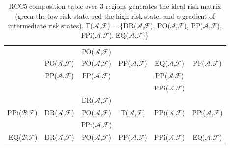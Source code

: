\documentclass[runningheads]{llncs}
\newcommand{\assertionRegion}{\mathcal{A}}
\newcommand{\beliefRegion}{\mathcal{B}}
\newcommand{\factRegion}{\mathcal{F}}
\newcommand{\eq}[2]{EQ(#1,#2)}
\newcommand{\pp}[2]{PP(#1,#2)}
\newcommand{\po}[2]{PO(#1,#2)}
\newcommand{\ppi}[2]{PPi(#1,#2)}
\newcommand{\dr}[2]{DR(#1,#2)}
\newcommand{\all}[2]{T(#1,#2)}
\begin{document}
\begin{table}[t]
\begin{adjustbox}{width=.6\columnwidth}
\begin{tabular}{r||c|c|c|c|c}
	\cellcolor{abf-rg-3}&
	\cellcolor{abf-rg-4} & %
	\cellcolor{abf-rg-5}\po{$\assertionRegion$}{$\factRegion$} & %
	\cellcolor{abf-rg-6}\\ %
 & \cellcolor{abf-rg-2}\po{$\assertionRegion$}{$\factRegion$} & 
	\cellcolor{abf-rg-3}\po{$\assertionRegion$}{$\factRegion$} & 
	\cellcolor{abf-rg-4}\pp{$\assertionRegion$}{$\factRegion$} & %
	\cellcolor{abf-rg-5}\eq{$\assertionRegion$}{$\factRegion$} & %
	\cellcolor{abf-rg-6}\pp{$\assertionRegion$}{$\factRegion$} \\ %
 & \cellcolor{abf-rg-2}\pp{$\assertionRegion$}{$\factRegion$} & 
	\cellcolor{abf-rg-3}\pp{$\assertionRegion$}{$\factRegion$} & 
	\cellcolor{abf-rg-4} & %
	\cellcolor{abf-rg-5}\pp{$\assertionRegion$}{$\factRegion$} & %
	\cellcolor{abf-rg-6} \\ %
 & \cellcolor{abf-rg-2}&
 	\cellcolor{abf-rg-3} & 
	\cellcolor{abf-rg-4}& %
	\cellcolor{abf-rg-5}\ppi{$\assertionRegion$}{$\factRegion$} & %
	\cellcolor{abf-rg-6} \\ %
\hline %
 \multirow{3}{*}{\ppi{$\beliefRegion$}{$\factRegion$}} &
 	\cellcolor{abf-rg-3}\multirow{3}{*}{} &
 	\cellcolor{abf-rg-4}\dr{$\assertionRegion$}{$\factRegion$} &
 	\cellcolor{abf-rg-5}& %
 	\cellcolor{abf-rg-6}& %
 	\cellcolor{abf-rg-7} \\ %
& \cellcolor{abf-rg-3}\dr{$\assertionRegion$}{$\factRegion$} &
 	\cellcolor{abf-rg-4}\po{$\assertionRegion$}{$\factRegion$} & 
 	\cellcolor{abf-rg-5}\all{$\assertionRegion$}{$\factRegion$}& %
 	\cellcolor{abf-rg-6}\ppi{$\assertionRegion$}{$\factRegion$}& %
 	\cellcolor{abf-rg-7}\ppi{$\assertionRegion$}{$\factRegion$}\\ %
& \cellcolor{abf-rg-3} & 
	\cellcolor{abf-rg-4}\ppi{$\assertionRegion$}{$\factRegion$} & 
	\cellcolor{abf-rg-5} & %
	\cellcolor{abf-rg-6}& %
	\cellcolor{abf-rg-7}\\ %
\hline %
	\eq{$\beliefRegion$}{$\factRegion$} & 
	\cellcolor{abf-rg-4}\dr{$\assertionRegion$}{$\factRegion$} & 
	\cellcolor{abf-rg-5} \po{$\assertionRegion$}{$\factRegion$} & 
	\cellcolor{abf-rg-6}\pp{$\assertionRegion$}{$\factRegion$} & %
	\cellcolor{abf-rg-7} \ppi{$\assertionRegion$}{$\factRegion$} & %
	\cellcolor{abfgreen} \eq{$\assertionRegion$}{$\factRegion$}  %
\end{tabular}
\end{adjustbox}
\caption{RCC5 composition table over 3 regions generates the ideal risk matrix
(green the low-risk state, red the high-risk state, and a gradient
of intermediate risk states). 
\all{$\assertionRegion$}{$\factRegion$} = \{\dr{$\assertionRegion$}{$\factRegion$}, \po{$\assertionRegion$}{$\factRegion$}, \pp{$\assertionRegion$}{$\factRegion$}, \ppi{$\assertionRegion$}{$\factRegion$}, \eq{$\assertionRegion$}{$\factRegion$}\}
\label{tab:5com}}
\end{table}
\end{document}
